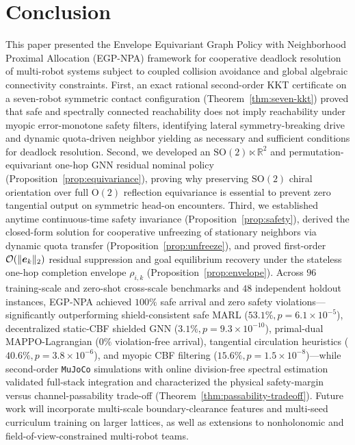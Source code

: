 \section{Conclusion}\label{sec:conclusion}

This paper presented the Envelope Equivariant Graph Policy with Neighborhood Proximal Allocation (EGP-NPA) framework for cooperative deadlock resolution of multi-robot systems subject to coupled collision avoidance and global algebraic connectivity constraints. First, an exact rational second-order KKT certificate on a seven-robot symmetric contact configuration (Theorem~\ref{thm:seven-kkt}) proved that safe and spectrally connected reachability does not imply reachability under myopic error-monotone safety filters, identifying lateral symmetry-breaking drive and dynamic quota-driven neighbor yielding as necessary and sufficient conditions for deadlock resolution. Second, we developed an $\mathrm{SO}(2)\ltimes\mathbb R^2$ and permutation-equivariant one-hop GNN residual nominal policy (Proposition~\ref{prop:equivariance}), proving why preserving $\mathrm{SO}(2)$ chiral orientation over full $\mathrm{O}(2)$ reflection equivariance is essential to prevent zero tangential output on symmetric head-on encounters. Third, we established anytime continuous-time safety invariance (Proposition~\ref{prop:safety}), derived the closed-form solution for cooperative unfreezing of stationary neighbors via dynamic quota transfer (Proposition~\ref{prop:unfreeze}), and proved first-order $\mathcal O(\lVert\boldsymbol{e}_k\rVert_2)$ residual suppression and goal equilibrium recovery under the stateless one-hop completion envelope $\rho_{i,k}$ (Proposition~\ref{prop:envelope}). Across $96$ training-scale and zero-shot cross-scale benchmarks and $48$ independent holdout instances, EGP-NPA achieved $100\%$ safe arrival and zero safety violations—significantly outperforming shield-consistent safe MARL ($53.1\%,p=6.1\times 10^{-5}$), decentralized static-CBF shielded GNN ($3.1\%,p=9.3\times 10^{-10}$), primal-dual MAPPO-Lagrangian ($0\%$ violation-free arrival), tangential circulation heuristics ($40.6\%,p=3.8\times 10^{-6}$), and myopic CBF filtering ($15.6\%,p=1.5\times 10^{-8}$)—while second-order \texttt{MuJoCo} simulations with online division-free spectral estimation validated full-stack integration and characterized the physical safety-margin versus channel-passability trade-off (Theorem~\ref{thm:passability-tradeoff}). Future work will incorporate multi-scale boundary-clearance features and multi-seed curriculum training on larger lattices, as well as extensions to nonholonomic and field-of-view-constrained multi-robot teams.
